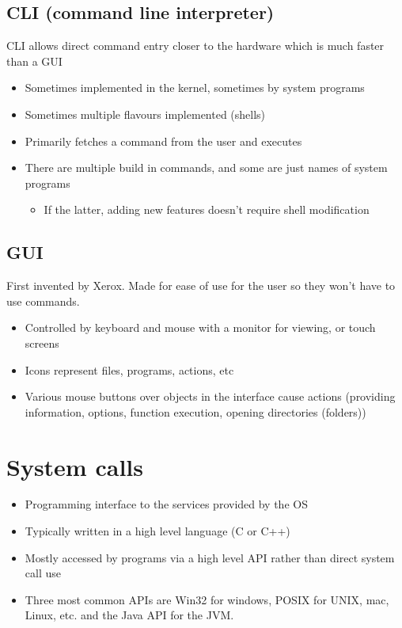 \documentclass[12pt]{book}
\begin{document}
\subsection*{CLI (command line interpreter)}

CLI allows direct command entry closer to the hardware which is much faster than a GUI

\begin{itemize}
    \item Sometimes implemented in the kernel, sometimes by system programs
    \item Sometimes multiple flavours implemented (shells)
    \item Primarily fetches a command from the user and executes
    \item There are multiple build in commands, and some are just names of system programs
    \begin{itemize}
        \item If the latter, adding new features doesn't require shell modification
    \end{itemize}
\end{itemize}

\subsection*{GUI}

First invented by Xerox. Made for ease of use for the user so they won't have to use commands.

\begin{itemize}
    \item Controlled by keyboard and mouse with a monitor for viewing, or touch screens
    \item Icons represent files, programs, actions, etc
    \item Various mouse buttons over objects in the interface cause actions (providing information, options, function execution, opening directories (folders))
\end{itemize}

\section*{System calls}

\begin{itemize}
    \item Programming interface to the services provided by the OS
    \item Typically written in a high level language (C or C++)
    \item Mostly accessed by programs via a high level API rather than direct system call use
    \item Three most common APIs are Win32 for windows, POSIX for UNIX, mac, Linux, etc. and the Java API for the JVM.
\end{itemize}
\end{document}

